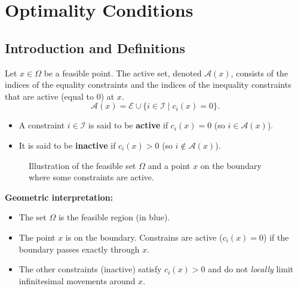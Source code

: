 \chapter{Optimality Conditions}
\label{chap:optimality-conditions}

\section{Introduction and Definitions}

\begin{definition}
Let $x \in \Omega$ be a feasible point. The active set, denoted $\mathcal{A}(x)$, consists of the indices of the equality constraints and the indices of the inequality constraints that are active (equal to 0) at $x$.
\[
    \mathcal{A}(x) = \mathcal{E} \cup \{ i \in \mathcal{I} \mid c_i(x) = 0 \}.
\]
\begin{itemize}
    \item A constraint $i \in \mathcal{I}$ is said to be \textbf{active} if $c_i(x) = 0$ (so $i \in \mathcal{A}(x)$).
    \item It is said to be \textbf{inactive} if $c_i(x) > 0$ (so $i \notin \mathcal{A}(x)$).
\end{itemize}
\end{definition}

\begin{figure}[H]
\centering
{}
\caption{Illustration of the feasible set $\Omega$ and a point $x$ on the boundary where some constraints are active.}
\label{fig:active-set}
\end{figure}

\begin{figureexplanation}
\textbf{Geometric interpretation:}
\begin{itemize}
    \item The set $\Omega$ is the feasible region (in blue).
    \item The point $x$ is on the boundary. Constrains are active ($c_i(x)=0$) if the boundary passes exactly through $x$.
    \item The other constraints (inactive) satisfy $c_i(x) > 0$ and do not \emph{locally} limit infinitesimal movements around $x$.
\end{itemize}
\end{figureexplanation}


